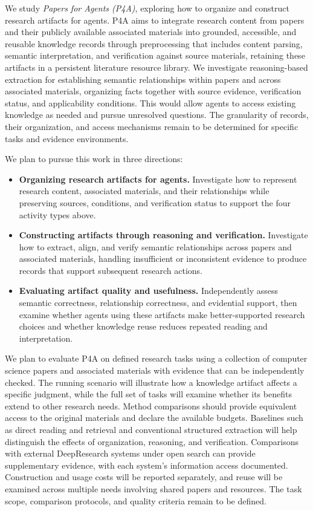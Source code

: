 \documentclass[sigconf,review,anonymous]{acmart}
\begin{document}
We study \emph{Papers for Agents (P4A)}, exploring how to organize and construct
research artifacts for agents. P4A aims to integrate research content from
papers and their publicly available associated materials into grounded,
accessible, and reusable knowledge records through preprocessing that includes
content parsing, semantic interpretation, and verification against source
materials, retaining these artifacts in a persistent literature resource
library. We investigate reasoning-based
extraction for establishing semantic relationships within papers and across
associated materials, organizing facts together with source evidence,
verification status, and applicability conditions. This would allow agents to
access existing knowledge as needed and pursue unresolved questions. The
granularity of records, their organization, and access mechanisms remain to be
determined for specific tasks and evidence environments.

We plan to pursue this work in three directions:
\begin{itemize}
\item \textbf{Organizing research artifacts for agents.} Investigate how to
represent research content, associated materials, and their relationships while
preserving sources, conditions, and verification status to support the four
activity types above.
\item \textbf{Constructing artifacts through reasoning and verification.}
Investigate how to extract, align, and verify semantic relationships across
papers and associated materials, handling insufficient or inconsistent evidence
to produce records that support subsequent research actions.
\item \textbf{Evaluating artifact quality and usefulness.} Independently assess
semantic correctness, relationship correctness, and evidential support, then
examine whether agents using these artifacts make better-supported research
choices and whether knowledge reuse reduces repeated reading and interpretation.
\end{itemize}

We plan to evaluate P4A on defined research tasks using a collection of computer
science papers and associated materials with evidence that can be independently
checked. The running scenario will illustrate how a knowledge artifact
affects a specific judgment, while the full set of tasks will examine whether
its benefits extend to other research needs. Method comparisons should provide
equivalent access to the original materials and declare the available budgets.
Baselines such as direct reading and retrieval and conventional structured
extraction will help distinguish the effects of organization, reasoning, and
verification. Comparisons with external DeepResearch systems under open search
can provide supplementary evidence, with each system's information access
documented. Construction and usage costs will be reported separately, and reuse
will be examined across multiple needs involving shared papers and resources.
The task scope, comparison protocols, and quality criteria remain to be defined.
\end{document}
